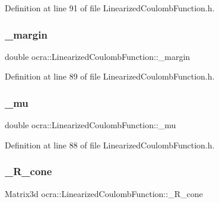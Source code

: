 Definition at line 91 of file Linearized\+Coulomb\+Function.\+h.

\hypertarget{classocra_1_1LinearizedCoulombFunction_abf137cc7ce5ea91ffa25a95feebddbd1}{}\label{classocra_1_1LinearizedCoulombFunction_abf137cc7ce5ea91ffa25a95feebddbd1} 
\subsubsection{\texorpdfstring{\+\_\+margin}{\_margin}}
{\footnotesize\ttfamily double ocra\+::\+Linearized\+Coulomb\+Function\+::\+\_\+margin\hspace{0.3cm}{\ttfamily [protected]}}



Definition at line 89 of file Linearized\+Coulomb\+Function.\+h.

\hypertarget{classocra_1_1LinearizedCoulombFunction_a18cfee3d5d056443d2fe1980b4899fa4}{}\label{classocra_1_1LinearizedCoulombFunction_a18cfee3d5d056443d2fe1980b4899fa4} 
\subsubsection{\texorpdfstring{\+\_\+mu}{\_mu}}
{\footnotesize\ttfamily double ocra\+::\+Linearized\+Coulomb\+Function\+::\+\_\+mu\hspace{0.3cm}{\ttfamily [protected]}}



Definition at line 88 of file Linearized\+Coulomb\+Function.\+h.

\hypertarget{classocra_1_1LinearizedCoulombFunction_abf999f311e6563224a5ac852f44e7af4}{}\label{classocra_1_1LinearizedCoulombFunction_abf999f311e6563224a5ac852f44e7af4} 
\subsubsection{\texorpdfstring{\+\_\+\+R\+\_\+cone}{\_R\_cone}}
{\footnotesize\ttfamily Matrix3d ocra\+::\+Linearized\+Coulomb\+Function\+::\+\_\+\+R\+\_\+cone\hspace{0.3cm}{\ttfamily [protected]}}



